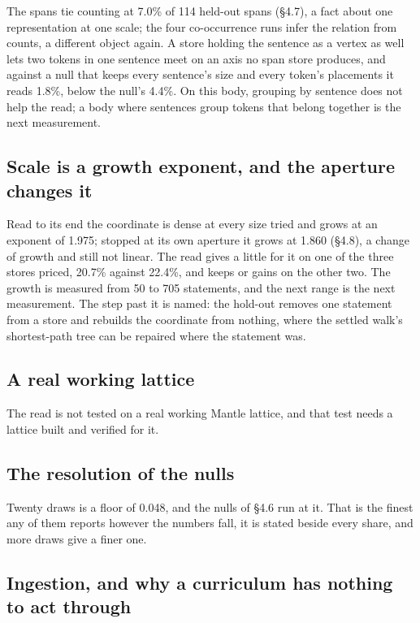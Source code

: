 \documentclass[10pt,letterpaper,twocolumn]{article}
\begin{document}
The spans tie counting at 7.0\% of 114 held-out spans (§4.7), a fact about one representation at one
scale; the four co-occurrence runs infer the relation from counts, a different object again. A store
holding the sentence as a vertex as well lets two tokens in one sentence meet on an axis no span store
produces, and against a null that keeps every sentence's size and every token's placements it reads
1.8\%, below the null's 4.4\%. On this body, grouping by sentence does not help the read; a body where
sentences group tokens that belong together is the next measurement.

\subsection{Scale is a growth exponent, and the aperture changes it}\label{scale-is-a-growth-exponent-and-the-aperture-changes-it}

Read to its end the coordinate is dense at every size tried and grows at an exponent of 1.975;
stopped at its own aperture it grows at 1.860 (§4.8), a change of growth and still not linear. The
read gives a little for it on one of the three stores priced, 20.7\% against 22.4\%, and keeps or gains
on the other two. The growth is measured from 50 to 705 statements, and the next range is the next
measurement. The step past it is named: the hold-out removes one statement from a store and rebuilds
the coordinate from nothing, where the settled walk's shortest-path tree can be repaired where the
statement was.

\subsection{A real working lattice}\label{a-real-working-lattice}

The read is not tested on a real working Mantle lattice, and that test needs a lattice built and
verified for it.

\subsection{The resolution of the nulls}\label{the-resolution-of-the-nulls}

Twenty draws is a floor of 0.048, and the nulls of §4.6 run at it. That is the finest any of them
reports however the numbers fall, it is stated beside every share, and more draws give a finer one.

\subsection{Ingestion, and why a curriculum has nothing to act through}\label{ingestion-and-why-a-curriculum-has-nothing-to-act-through}
\end{document}
